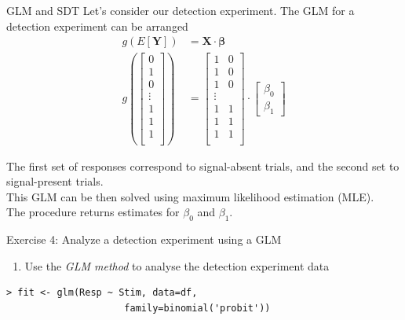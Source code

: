 \documentclass[10pt]{beamer}
\begin{document}
\begin{frame}{GLM and SDT}
Let's consider our detection experiment. The GLM for a detection experiment can be arranged
\begin{align*}
g(E[\mathbf{Y}]) &= \mathbf{X} \cdot \mathbf{\beta}\\
    g( 
    \begin{bmatrix}
           0 \\
           1 \\
           0 \\
           \vdots \\
           1 \\
           1 \\
           1 \\
    \end{bmatrix} ) &= 
    \begin{bmatrix}
           1 & 0 \\
           1 & 0 \\
           1 & 0 \\
           \vdots \\
           1 & 1 \\
           1 & 1 \\
           1 & 1 \\
    \end{bmatrix} \cdot
    \begin{bmatrix}
           \beta_0 \\
           \beta_1 
    \end{bmatrix}
\end{align*}

The first set of responses correspond to signal-absent trials, and the second set to signal-present trials. \\
This GLM can be then solved using maximum likelihood estimation (MLE).\\
The procedure returns estimates for $\beta_0$ and $\beta_1$.


\end{frame}


\begin{frame}[fragile]{Exercise 4: Analyze a detection experiment using a GLM}
\begin{enumerate}
\item Use the \textit{GLM method} to analyse the detection experiment data\\
\end{enumerate}

\pause
\begin{verbatim}
> fit <- glm(Resp ~ Stim, data=df, 
                     family=binomial('probit'))
\end{verbatim}
\end{frame}
\end{document}
